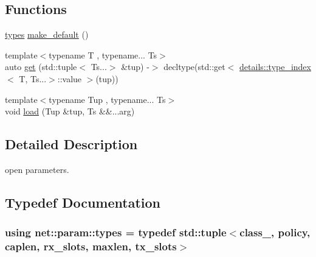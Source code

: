 \subsection*{Functions}
\begin{DoxyCompactItemize}
\item 
\hyperlink{namespacenet_1_1param_a0d926c5e535309178d47ac5366bfb539}{types} \hyperlink{namespacenet_1_1param_a03072e1c0a005826ed22d692d3f88074}{make\+\_\+default} ()
\item 
{\footnotesize template$<$typename T , typename... Ts$>$ }\\auto \hyperlink{namespacenet_1_1param_a9020a1d5f00da972acbea3e809d3c602}{get} (std\+::tuple$<$ Ts...$>$ \&tup) -\/$>$ decltype(std\+::get$<$ \hyperlink{structnet_1_1param_1_1details_1_1type__index}{details\+::type\+\_\+index}$<$ T, Ts...$>$\+::value $>$(tup))
\item 
{\footnotesize template$<$typename Tup , typename... Ts$>$ }\\void \hyperlink{namespacenet_1_1param_aef5f360e345f5ab876c171a76a0777a2}{load} (Tup \&tup, Ts \&\&...arg)
\end{DoxyCompactItemize}


\subsection{Detailed Description}
open parameters. 

\subsection{Typedef Documentation}
\hypertarget{namespacenet_1_1param_a0d926c5e535309178d47ac5366bfb539}{
\subsubsection[{types}]{\setlength{\rightskip}{0pt plus 5cm}using {\bf net\+::param\+::types} = typedef std\+::tuple$<${\bf class\+\_\+}, {\bf policy}, {\bf caplen}, {\bf rx\+\_\+slots}, {\bf maxlen}, {\bf tx\+\_\+slots}$>$}}\label{namespacenet_1_1param_a0d926c5e535309178d47ac5366bfb539}


